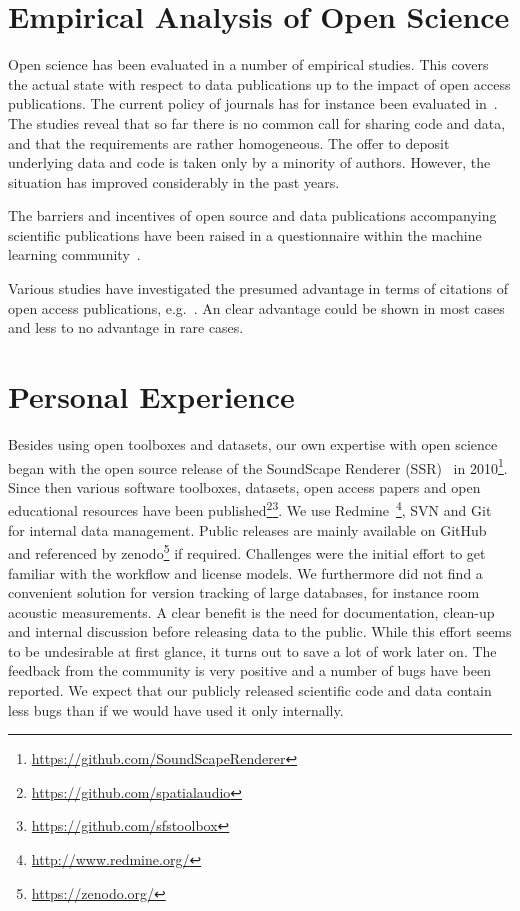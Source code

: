 \documentclass[a4paper, 10pt, twocolumn]{article}
\begin{document}
\section*{Empirical Analysis of Open Science} \label{sec:empirical_analysis}

Open science has been evaluated in a number of empirical studies. This covers the
actual state with respect to data publications up to the impact of open access 
publications. The current policy of journals has for instance been evaluated in~\cite{Stodden2013:PLOS1,Alsheikh11:PLOS}. The studies reveal that so far there is 
no common call for sharing code and data, and that the requirements are rather 
homogeneous. The offer to deposit underlying data and code is taken only by a minority
of authors. However, the situation has improved considerably in the past years.

The barriers and incentives of open source and data publications accompanying 
scientific publications have been raised in a questionnaire within the machine 
learning community~\cite{}.

Various studies have investigated the presumed advantage in terms of citations of
open access publications, e.g.~\cite{Swan10:study,McCabe14:EI}. An clear advantage 
could be shown in most cases and less to no advantage in rare cases.


\section*{Personal Experience} \label{sec:personal_experience}

Besides using open toolboxes and datasets, our own expertise with open science began 
with the open source release of the SoundScape Renderer (SSR)~\cite{Geier07:DEGA} in 
2010\footnote{\url{https://github.com/SoundScapeRenderer}}. Since then various software toolboxes, 
datasets, open access papers and open educational resources have been 
published\footnote{\url{https://github.com/spatialaudio}}\footnote{\url{https://github.com/sfstoolbox}}. 
We use Redmine~\footnote{\url{http://www.redmine.org/}}, SVN and Git for internal data management. Public releases are mainly
available on GitHub and referenced by zenodo\footnote{\url{https://zenodo.org/}} if required. Challenges were the initial effort to get familiar with the workflow and license models. We furthermore did not find
a convenient solution for version tracking of large databases, for instance room 
acoustic measurements. A clear benefit is the need for documentation, clean-up and internal
discussion before releasing data to the public. While this effort seems to be undesirable at
first glance, it turns out to save a lot of work later on. The feedback from the community
is very positive and a number of bugs have been reported. We expect that our publicly 
released scientific code and data contain less bugs than if we would have used it 
only internally. 
\end{document}
